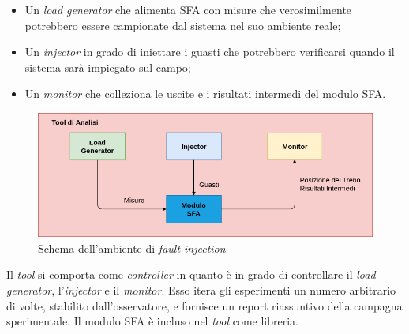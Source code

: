 \begin{itemize}
	\item Un \emph{load generator} che alimenta SFA con misure che verosimilmente potrebbero essere campionate dal sistema nel suo ambiente reale;
	\item Un \emph{injector} in grado di iniettare i guasti che potrebbero verificarsi quando il sistema sar\`a impiegato sul campo;
	\item Un \emph{monitor} che colleziona le uscite e i risultati intermedi del modulo SFA.
\end{itemize}
\begin{figure}[h]
	\centering
	\includegraphics[width=0.7\linewidth]{img/faultinjrtt}
	\caption{Schema dell'ambiente di \emph{fault injection}}
	\label{fig:faultinjrtt}
\end{figure}
Il \emph{tool} si comporta come \emph{controller} in quanto \`e in grado di controllare il \emph{load generator}, l'\emph{injector} e il \emph{monitor}. Esso itera gli esperimenti un numero arbitrario di volte, stabilito dall'osservatore, e fornisce un report riassuntivo della campagna sperimentale. Il modulo SFA \`e incluso nel \emph{tool} come libreria.
